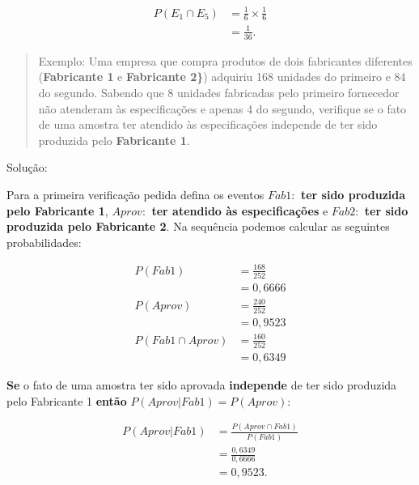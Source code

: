 \documentclass[
]{book}
\begin{document}
\hfill\break

\begin{align*}
P(E_{1} \cap E_{5}) & = \frac{1}{6} \times \frac{1}{6}\\
                    & = \frac{1}{36}.
\end{align*}

\hfill\break

\begin{quote}
Exemplo: Uma empresa que compra produtos de dois fabricantes diferentes (\textbf{Fabricante 1} e \textbf{Fabricante 2\}}) adquiriu 168 unidades do primeiro e 84 do segundo. Sabendo que 8 unidades fabricadas pelo primeiro fornecedor não atenderam às especificações e apenas 4 do segundo, verifique se o fato de uma amostra ter atendido às especificações independe de ter sido produzida pelo \textbf{Fabricante 1}.
\end{quote}

\hfill\break

Solução:

\hfill\break

Para a primeira verificação pedida defina os eventos \textbf{\(Fab1:\) ter sido produzida pelo Fabricante 1}, \textbf{\(Aprov:\) ter atendido às especificações} e \textbf{\(Fab2:\) ter sido produzida pelo Fabricante 2}. Na sequência podemos calcular as seguintes probabilidades:

\hfill\break

\begin{align*}
P(Fab1)   & = \frac{168}{252} \\
          & = 0,6666 \\
P(Aprov)  & = \frac{240}{252} \\
          & = 0,9523 \\
P(Fab1 \cap Aprov) & = \frac{160}{252} \\
          & =  0,6349  
\end{align*}

\hfill\break

\textbf{Se} o fato de uma amostra ter sido aprovada \textbf{independe} de ter sido produzida pelo Fabricante 1 \textbf{então} \(P(Aprov|Fab1) = P(Aprov)\):

\hfill\break

\begin{align*}
P(Aprov|Fab1) & = \frac{P(Aprov \cap Fab1)}{P(Fab1)} \\
              & = \frac{0,6349}{0,6666} \\
              & =  0,9523.
\end{align*}
\end{document}
